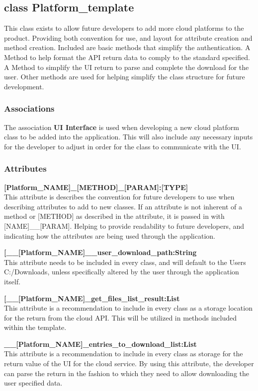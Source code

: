 \subsection{class Platform\_template}
This class exists to allow future developers to add more cloud platforms to the product. Providing both convention for use, and layout 
for attribute creation and method creation. Included are basic methods that simplify the authentication. A Method to help format the 
API return data to comply to the standard specified. A Method to simplify the UI return to parse and complete the download for the user.
Other methods are used for helping simplify the class structure for future development. 

\subsubsection{Associations}
The association \textbf{UI Interface} is used when developing a new cloud platform class to be added into the application. This will also 
include any necessary inputs for the developer to adjust in order for the class to communicate with the UI. 


\subsubsection{Attributes}
\textbf{[Platform\_NAME]\_[METHOD]\_[PARAM]:[TYPE]} \\
This attribute is describes the convention for future developers to use when describing attributes to add to new classes. 
If an attribute is not inherent of a method or [METHOD] as described in the attribute, it is passed in with [NAME]\_\_[PARAM].
Helping to provide readability to future developers, and indicating how the attributes are being used through the application.

\textbf{[\_\_[Platform\_NAME]\_\_user\_download\_path:String} \\
This attribute needs to be included in every class, and will default to the Users C:/Downloads, unless specifically altered by the user 
through the application itself. 

\textbf{[\_\_[Platform\_NAME]\_get\_files\_list\_result:List} \\
This attribute is a recommendation to include in every class as a storage location for the return from the cloud API. This will be 
utilized in methods included within the template. 

\textbf{\_\_[Platform\_NAME]\_entries\_to\_download\_list:List} \\
This attribute is a recommendation to include in every class as storage for the return value of the UI for the cloud service. By using
this attribute, the developer can parse the return in the fashion to which they need to allow downloading the user specified data.

